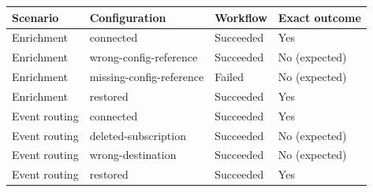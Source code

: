 \begin{tabular}{llll}\toprule
Scenario & Configuration & Workflow & Exact outcome \\\midrule
Enrichment & connected & Succeeded & Yes \\
Enrichment & wrong-config-reference & Succeeded & No (expected) \\
Enrichment & missing-config-reference & Failed & No (expected) \\
Enrichment & restored & Succeeded & Yes \\
Event routing & connected & Succeeded & Yes \\
Event routing & deleted-subscription & Succeeded & No (expected) \\
Event routing & wrong-destination & Succeeded & No (expected) \\
Event routing & restored & Succeeded & Yes \\
\bottomrule\end{tabular}
